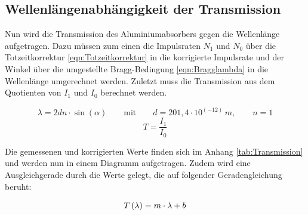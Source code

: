\documentclass[titlepage = firstcover]{scrartcl}
\begin{document}
        \subsection{Wellenlängenabhängigkeit der Transmission}
        \noindent
        Nun wird die Transmission des Aluminiumabsorbers gegen die Wellenlänge aufgetragen. Dazu müssen zum einen die Impulsraten $N_1$ und $N_0$ über die 
        Totzeitkorrektur \ref{eqn:Totzeitkorrektur} in die korrigierte Impulsrate und der Winkel über die umgestellte Bragg-Bedingung \ref{eqn:Bragglambda} in die 
        Wellenlänge umgerechnet werden. Zuletzt muss die Transmission aus dem Quotienten von  $I_1$ und $I_0$ berechnet werden.

        \begin{equation}
            \lambda = 2dn \cdot \sin(\alpha) \qquad \text{mit} \qquad d=201,4\cdot 10^{\left(-12\right)} \, m, \qquad n=1
            \label{eqn:Bragglambda}
        \end{equation}
        \begin{equation}
            T = \frac{I_1}{I_0}
            \label{eqn:Trans}
        \end{equation}
        
        \noindent
        Die gemessenen und korrigierten Werte finden sich im Anhang \ref{tab:Transmission} und werden nun in einem Diagramm aufgetragen. Zudem wird eine 
        Ausgleichgerade durch die Werte gelegt, die auf folgender Geradengleichung beruht:

        \begin{equation}
            T\left(\lambda \right) = m \cdot \lambda + b\\
            \label{eqn:Regression}
        \end{equation}
\end{document}

